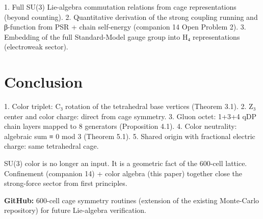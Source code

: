 \documentclass[12pt]{article}
\begin{document}
1. Full SU(3) Lie-algebra commutation relations from cage representations (beyond counting).
2. Quantitative derivation of the strong coupling running and β-function from PSR + chain self-energy (companion 14 Open Problem 2).
3. Embedding of the full Standard-Model gauge group into H₄ representations (electroweak sector).

\section{Conclusion}

1. Color triplet: C₃ rotation of the tetrahedral base vertices (Theorem 3.1).
2. Z₃ center and color charge: direct from cage symmetry.
3. Gluon octet: 1+3+4 qDP chain layers mapped to 8 generators (Proposition 4.1).
4. Color neutrality: algebraic sum ≡ 0 mod 3 (Theorem 5.1).
5. Shared origin with fractional electric charge: same tetrahedral cage.

SU(3) color is no longer an input. It is a geometric fact of the 600-cell lattice. Confinement (companion 14) + color algebra (this paper) together close the strong-force sector from first principles.

\textbf{GitHub:} 600-cell cage symmetry routines (extension of the existing Monte-Carlo repository) for future Lie-algebra verification.
\end{document}
